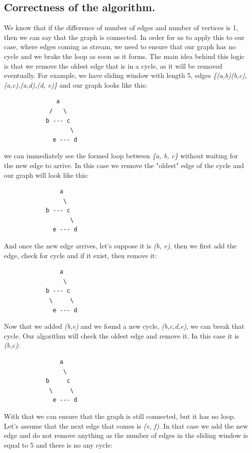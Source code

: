 \documentclass[11pt,a4paper,english]{article}
\begin{document}
      \subsection{Correctness of the algorithm.}
        We know that if the difference of number of edges and number of vertices is 1, then we can say that the graph is connected. In order for us to apply this to our case, where edges coming as stream, we need to ensure that our graph has no cycle and we brake the loop as soon as it forms. The main idea behind this logic is that we remove the oldest edge that is in a cycle, as it will be removed eventually. For example, we have sliding window with length 5, edges \textit{\{(a,b)(b,c),(a,c),(a,d),(d, e)\}}  and our graph looks like this:
        \begin{verbatim}
               a
             /   \
            b --- c
                   \
              e --- d
        \end{verbatim}
        we can immediately see the formed loop between \textit{\{a, b, c\}} without waiting for the new edge to arrive. In this case we remove the "oldest" edge of the cycle and our graph will look like this:
        \begin{verbatim}
                a
                 \
            b --- c
                   \
              e --- d
        \end{verbatim}
        And once the new edge arrives, let's suppose it is \textit{(b, e)}, then we first add the edge, check for cycle and if it exist, then remove it:
        \begin{verbatim}
                a
                 \
            b --- c
             \     \
              e --- d
        \end{verbatim}
        Now that we added \textit{(b,e)} and we found a new cycle, \textit{(b,c,d,e)}, we can break that cycle. Our algorithm will check the oldest edge and remove it. In this case it is \textit{(b,c)}:
        \begin{verbatim}
                a
                 \
            b     c
             \     \
              e --- d
        \end{verbatim}
        With that we can ensure that the graph is still connected, but it has no loop. \\
        Let's assume that the next edge that comes is \textit{(e, f)}. In that case we add the new edge and do not remove anything as the number of edges in the sliding window is equal to 5 and there is no any cycle:
\end{document}
